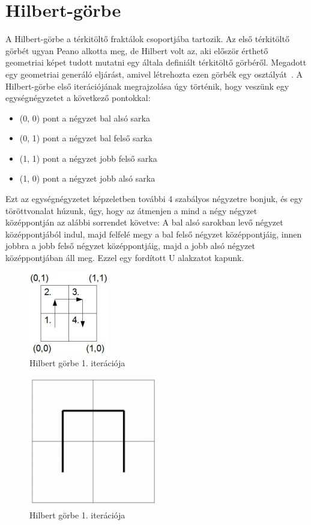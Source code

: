 \section{Hilbert-görbe}
A Hilbert-görbe a térkitöltő fraktálok csoportjába tartozik. Az első térkitöltő görbét ugyan Peano alkotta meg, de Hilbert volt az, aki először érthető geometriai képet tudott mutatni egy általa definiált térkitöltő görbéről. Megadott egy geometriai generáló eljárást, amivel létrehozta ezen görbék egy osztályát~\cite{hilbert-wiki}. A Hilbert-görbe első iterációjának megrajzolása úgy történik, hogy veszünk egy egységnégyzetet a következő pontokkal:
\begin{itemize}
	\item (0, 0) pont a négyzet bal alsó sarka
	\item (0, 1) pont a négyzet bal felső sarka
	\item (1, 1) pont a négyzet jobb felső sarka
	\item (1, 0) pont a négyzet jobb alsó sarka
\end{itemize}
Ezt az egységnégyzetet képzeletben további 4 szabályos négyzetre bonjuk, és egy töröttvonalat húzunk, úgy, hogy az átmenjen a mind a négy négyzet középpontján az alábbi sorrendet követve: A bal alsó sarokban levő négyzet középpontjából indul, majd felfelé megy a bal felső négyzet középpontjáig, innen jobbra a jobb felső négyzet középpontjáig, majd a jobb alsó négyzet középpontjában áll meg. Ezzel egy fordított U alakzatot kapunk. 
\begin{figure}[!ht]
	\begin{center}
		\includegraphics{img/HilbertCurve1-1}
		\caption[labelInTOC]{Hilbert görbe 1. iterációja}
	\end{center}
\end{figure}
\begin{figure}[!ht]
	\begin{center}
		\includegraphics[width=0.5\textwidth]{img/HilbertCurve1-2}
		\caption[labelInTOC]{Hilbert görbe 1. iterációja}
	\end{center}
\end{figure}
